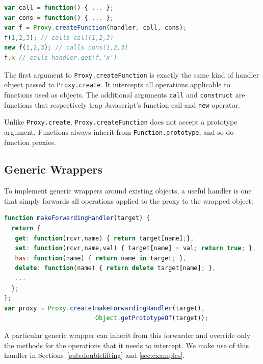 \documentclass{sig-alternate}
\begin{document}
\begin{lstlisting}[language=javascript]
var call = function() { ... };
var cons = function() { ... };
var f = Proxy.createFunction(handler, call, cons);
f(1,2,3); // calls call(1,2,3)
new f(1,2,3); // calls cons(1,2,3)
f.x // calls handler.get(f,'x')
\end{lstlisting}

The first argument to \texttt{Proxy.createFunction} is exactly the same kind of handler object passed to \texttt{Proxy.create}. It intercepts all operations applicable to functions used as objects. The additional arguments \texttt{call} and \texttt{construct} are functions that respectively trap Javascript's function call and \texttt{new} operator.

Unlike \texttt{Proxy.create}, \texttt{Proxy.createFunction} does not accept a prototype argument. Functions always inherit from \texttt{Function.prototype}, and so do function proxies.


\subsection{Generic Wrappers}
\label{sub:wrappers}

To implement generic wrappers around existing objects, a useful handler is one that simply forwards all operations applied to the proxy to the wrapped object:

\begin{lstlisting}[language=javascript]
function makeForwardingHandler(target) {
  return {
   get: function(rcvr,name) { return target[name];},
   set: function(rcvr,name,val) { target[name] = val; return true; },
   has: function(name) { return name in target; },
   delete: function(name) { return delete target[name]; },
   ...
  };
};
var proxy = Proxy.create(makeForwardingHandler(target),
                         Object.getPrototypeOf(target));
\end{lstlisting}

A particular generic wrapper can inherit from this forwarder and override only the methods for the operations that it needs to intercept. We make use of this handler in Sections~\ref{sub:doublelifting} and \ref{sec:examples}.
\end{document}
